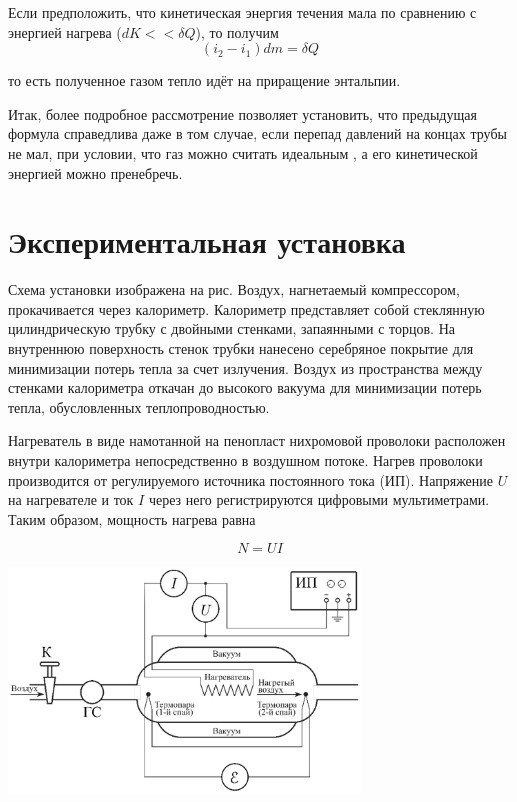 \documentclass[a4paper,12pt]{article}
\begin{document}
        Если предположить, что кинетическая энергия течения мала по сравнению с энергией нагрева (\(dK<< \delta Q\)), то получим 
        \[(i_2 - i_1)dm = \delta Q\]

        то есть полученное газом тепло идёт на приращение энтальпии.

        Итак, более подробное рассмотрение позволяет установить, что предыдущая формула справедлива даже в том случае, если перепад давлений на концах трубы не мал, при условии, что газ можно считать идеальным , а его кинетической энергией можно пренебречь.
       
        \section{Экспериментальная установка}

        Схема установки изображена на рис.  Воздух, нагнетаемый компрессором, прокачивается через калориметр. Калориметр представляет собой стеклянную цилиндрическую трубку с двойными стенками, запаянными с торцов. На внутреннюю поверхность стенок трубки нанесено серебряное покрытие для минимизации потерь тепла за счет излучения. Воздух из пространства между стенками калориметра откачан до высокого вакуума  для минимизации потерь тепла, обусловленных теплопроводностью.

        Нагреватель в виде намотанной на пенопласт нихромовой проволоки расположен внутри калориметра непосредственно в воздушном потоке. Нагрев
        проволоки производится от регулируемого источника постоянного тока (ИП).
        Напряжение \(U\) на нагревателе и ток \(I\) через него регистрируются цифровыми
        мультиметрами. Таким образом, мощность нагрева равна

        \[N = UI\]

        \begin{center}
		\includegraphics[width=0.7\textwidth]{asd.png}
	\end{center}
\end{document}

